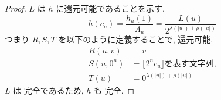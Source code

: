 \begin{proof}
 $L$ は $h$ に還元可能であることを示す.
 \begin{equation}
  h(c_u) = \frac{h_u(1)}{\Lambda_u}
   = \frac{L(u)}{2^{\lambda(|u|)+\rho(|u|)}}
 \end{equation}
 つまり $R,S,T$ を以下のように定義することで, 還元可能.
 \begin{align}
  R(u,v) &= v \\
  S(u, 0^n) &= \lfloor 2^nc_u \rfloor \text{を表す文字列,} \\
  T(u) &= 0^{\lambda(|u|)+\rho(|u|)}
 \end{align}
 $L$ は \PSPACE 完全であるため, $h$ も \PSPACE 完全.
\end{proof}

